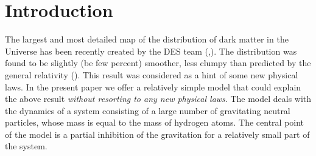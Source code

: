 \documentclass[referee]{raa}            %
\begin{document}
	
	\maketitle
	
	\section{Introduction}           %
	\label{sect:intro}
	
	The largest and most detailed map of the distribution of dark matter in the Universe has been recently created by the DES team (\citealt{Chang+etal+2018},\citealt{Jeffrey+etal+2021}). The distribution was found to be slightly (be few percent) smoother, less clumpy than predicted by the general relativity (\citealt{Jeffrey+etal+2021}). This result was considered as a hint of some new physical laws.
	In the present paper we offer a relatively simple model that could explain the above result \textit{without resorting to any new physical laws}. The model deals with the dynamics of a system consisting of a large number of gravitating neutral particles, whose mass is equal to the mass of hydrogen atoms. The central point of the model is a partial inhibition of the gravitation for a relatively small part of the system.
	
\end{document}
